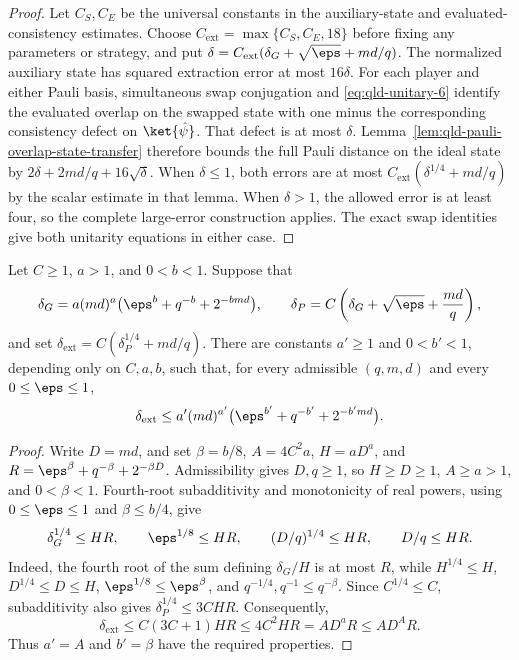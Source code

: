 \begin{proof}
	Let $C_S,C_E$ be the universal constants in the auxiliary-state and
	evaluated-consistency estimates. Choose
	$C_{\mathrm{ext}}=\max\{C_S,C_E,18\}$ before fixing any parameters or
	strategy, and put $\delta=C_{\mathrm{ext}}(\delta_G+\sqrt\eps+md/q)$.
	The normalized auxiliary state has squared extraction error at most
	$16\delta$. For each player and either Pauli basis, simultaneous swap
	conjugation and \eqref{eq:qld-unitary-6} identify the evaluated overlap
	on the swapped state with one minus the corresponding consistency defect
	on $\ket{\hat\psi}$. That defect is at most $\delta$.
	Lemma~\ref{lem:qld-pauli-overlap-state-transfer} therefore bounds the
	full Pauli distance on the ideal state by
	$2\delta+2md/q+16\sqrt\delta$.
	When $\delta\leq1$, both errors are at most
	$C_{\mathrm{ext}}(\delta^{1/4}+md/q)$ by the scalar estimate in that lemma.
	When $\delta>1$, the allowed error is at least four, so the complete
	large-error construction applies. The exact swap identities give both
	unitarity equations in either case.
\end{proof}

\begin{lemma}\label{lem:qld-extraction-error-form}
	\leanok
	Let $C\geq1$, $a>1$, and $0<b<1$. Suppose that
	\[
		\delta_G=a(md)^a\bigl(\eps^b+q^{-b}+2^{-bmd}\bigr),
		\qquad
		\delta_P=C\left(\delta_G+\sqrt{\eps}+\frac{md}{q}\right),
	\]
	and set $\delta_{\mathrm{ext}}=C(\delta_P^{1/4}+md/q)$. There are constants
	$a'\geq1$ and $0<b'<1$, depending only on $C,a,b$, such that, for every
	admissible $(q,m,d)$ and every $0\leq\eps\leq1$,
	\[
		\delta_{\mathrm{ext}}
		\leq a'(md)^{a'}\bigl(\eps^{b'}+q^{-b'}+2^{-b'md}\bigr).
	\]
\end{lemma}
\begin{proof}
	\leanok
	Write $D=md$, and set $\beta=b/8$, $A=4C^2a$, $H=aD^a$, and
	$R=\eps^\beta+q^{-\beta}+2^{-\beta D}$.
	Admissibility gives $D,q\geq1$, so $H\geq D\geq1$, $A\geq a>1$,
	and $0<\beta<1$. Fourth-root subadditivity and monotonicity of real
	powers, using $0\leq\eps\leq1$ and $\beta\leq b/4$, give
	\[
		\delta_G^{1/4}\leq HR,\qquad
		\eps^{1/8}\leq HR,\qquad
		(D/q)^{1/4}\leq HR,\qquad D/q\leq HR.
	\]
	Indeed, the fourth root of the sum defining $\delta_G/H$ is at most
	$R$, while $H^{1/4}\leq H$, $D^{1/4}\leq D\leq H$,
	$\eps^{1/8}\leq\eps^\beta$, and $q^{-1/4},q^{-1}\leq q^{-\beta}$.
	Since $C^{1/4}\leq C$, subadditivity also gives
	$\delta_P^{1/4}\leq3CHR$. Consequently,
	\[
		\delta_{\mathrm{ext}}
		\leq C(3C+1)HR\leq4C^2HR=AD^aR\leq AD^AR.
	\]
	Thus $a'=A$ and $b'=\beta$ have the required properties.
\end{proof}

